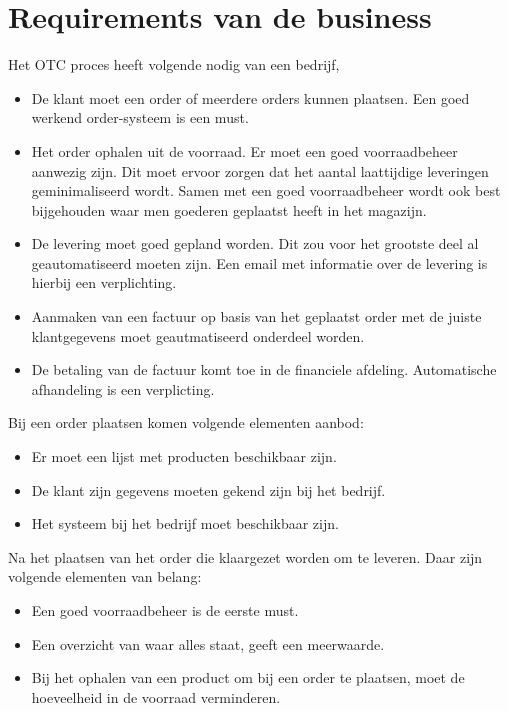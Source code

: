 \section{Requirements van de business}
Het OTC proces heeft volgende nodig van een bedrijf, \textcite{Biedron2018}
\begin{itemize}
	\item De klant moet een order of meerdere orders kunnen plaatsen. Een goed werkend order-systeem is een must.
	\item Het order ophalen uit de voorraad. Er moet een goed voorraadbeheer aanwezig zijn. Dit moet ervoor zorgen dat het aantal laattijdige leveringen geminimaliseerd wordt. Samen met een goed voorraadbeheer wordt ook best bijgehouden waar men goederen geplaatst heeft in het magazijn.
	\item De levering moet goed gepland worden. Dit zou voor het grootste deel al geautomatiseerd moeten zijn. Een email met informatie over de levering is hierbij een verplichting. 
	\item Aanmaken van een factuur op basis van het geplaatst order met de juiste klantgegevens moet geautmatiseerd onderdeel worden. 
	\item De betaling van de factuur komt toe in de financiele afdeling. Automatische afhandeling is een verplicting.
\end{itemize}
Bij een order plaatsen komen volgende elementen aanbod:
\begin{itemize}
	\item Er moet een lijst met producten beschikbaar zijn.
	\item De klant zijn gegevens moeten gekend zijn bij het bedrijf.
	\item Het systeem bij het bedrijf moet beschikbaar zijn.
\end{itemize}
Na het plaatsen van het order die klaargezet worden om te leveren. Daar zijn volgende elementen van belang:
\begin{itemize}
	\item Een goed voorraadbeheer is de eerste must.
	\item Een overzicht van waar alles staat, geeft een meerwaarde.
	\item Bij het ophalen van een product om bij een order te plaatsen, moet de hoeveelheid in de voorraad verminderen.
\end{itemize}
